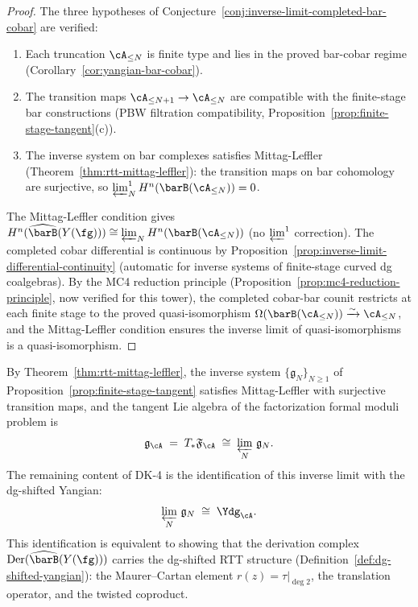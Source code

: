 \begin{proof}
The three hypotheses of
Conjecture~\ref{conj:inverse-limit-completed-bar-cobar} are verified:
\begin{enumerate}[label=\textup{(\roman*)}]
\item Each truncation $\cA_{\leq N}$ is finite type and lies in
  the proved bar-cobar regime
  (Corollary~\ref{cor:yangian-bar-cobar}).
\item The transition maps $\cA_{\leq N+1} \to \cA_{\leq N}$ are
  compatible with the finite-stage bar constructions
  (PBW filtration compatibility,
  Proposition~\ref{prop:finite-stage-tangent}(c)).
\item The inverse system on bar complexes satisfies Mittag-Leffler
  (Theorem~\ref{thm:rtt-mittag-leffler}): the transition maps
  on bar cohomology are surjective, so
  $\varprojlim^1_N H^n(\barB(\cA_{\leq N})) = 0$.
\end{enumerate}
The Mittag-Leffler condition gives
$H^n(\widehat{\barB}(Y(\fg)))
\cong \varprojlim_N H^n(\barB(\cA_{\leq N}))$
(no $\varprojlim^1$ correction).  The completed cobar differential
is continuous by
Proposition~\ref{prop:inverse-limit-differential-continuity}
(automatic for inverse systems of finite-stage curved dg
coalgebras).  By the MC4 reduction principle
(Proposition~\ref{prop:mc4-reduction-principle},
now verified for this tower), the completed cobar-bar counit
restricts at each finite stage to the proved
quasi-isomorphism
$\Omega(\barB(\cA_{\leq N})) \xrightarrow{\sim} \cA_{\leq N}$,
and the Mittag-Leffler condition ensures the inverse limit
of quasi-isomorphisms is a quasi-isomorphism.
\end{proof}

\begin{conjecture}
\label{conj:dk4-inverse-limit}
By Theorem~\textup{\ref{thm:rtt-mittag-leffler}}, the
inverse system $\{\mathfrak{g}_N\}_{N \geq 1}$ of
Proposition~\textup{\ref{prop:finite-stage-tangent}} satisfies
Mittag-Leffler with surjective transition maps, and the tangent
Lie algebra of the factorization formal moduli problem is
\[
\mathfrak{g}_{\cA}
\;=\;
T_{*}\mathfrak{F}_{\cA}
\;\cong\;
\varprojlim_N\, \mathfrak{g}_N.
\]
The remaining content of DK-4 is the identification of this
inverse limit with the dg-shifted Yangian:
\[
\varprojlim_N\, \mathfrak{g}_N
\;\cong\;
\Ydg_{\cA}.
\]
This identification is equivalent to showing that the derivation
complex $\operatorname{Der}(\widehat{\barB}(Y(\fg)))$
carries the dg-shifted RTT structure
\textup{(}Definition~\textup{\ref{def:dg-shifted-yangian}}\textup{)}:
the Maurer--Cartan element $r(z) = \tau|_{\deg 2}$, the
translation operator, and the twisted coproduct.
\end{conjecture}

